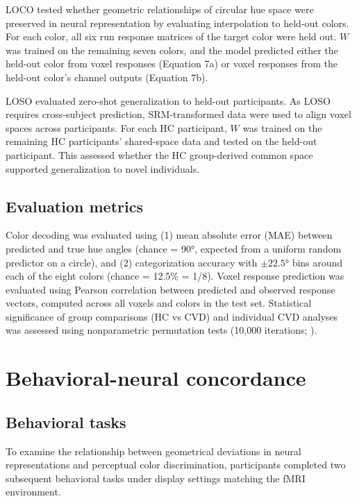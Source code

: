 LOCO tested whether geometric relationships of circular hue space were preserved in neural representation by evaluating interpolation to held-out colors. For each color, all six run response matrices of the target color were held out. $W$ was trained on the remaining seven colors, and the model predicted either the held-out color from voxel responses (Equation 7a) or voxel responses from the held-out color's channel outputs (Equation 7b).

LOSO evaluated zero-shot generalization to held-out participants. As LOSO requires cross-subject prediction, SRM-transformed data were used to align voxel spaces across participants. For each HC participant, $W$ was trained on the remaining HC participants' shared-space data and tested on the held-out participant. This assessed whether the HC group-derived common space supported generalization to novel individuals.

\subsection*{Evaluation metrics}

 Color decoding was evaluated using (1) mean absolute error (MAE) between predicted and true hue angles (chance = 90°, expected from a uniform random predictor on a circle), and (2) categorization accuracy with $\pm 22.5$° bins around each of the eight colors (chance = 12.5\% = 1/8). Voxel response prediction was evaluated using Pearson correlation between predicted and observed response vectors, computed across all voxels and colors in the test set. Statistical significance of group comparisons (HC vs CVD) and individual CVD analyses was assessed using nonparametric permutation tests (10,000 iterations; ).

\section{Behavioral-neural concordance}

\subsection*{Behavioral tasks}

To examine the relationship between geometrical deviations in neural representations and perceptual color discrimination, participants completed two subsequent behavioral tasks under display settings matching the fMRI environment.

